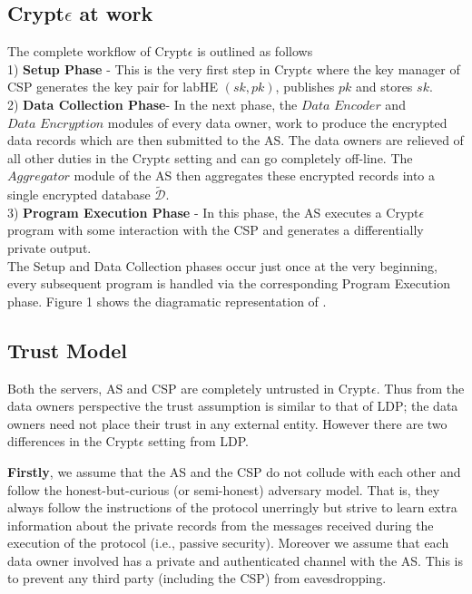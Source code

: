 \subsection{Crypt$\epsilon$ at work}
The complete workflow of Crypt$\epsilon$ is outlined as follows\\1) \textbf{\textsf{Setup Phase}} - This is the very first step in Crypt$\epsilon$ where the key manager of \textsf{CSP} generates the key pair for labHE $(sk,pk)$, publishes $pk$ and stores $sk$. \\2) \textbf{\textsf{Data Collection Phase}}- In the next phase, the $\textit{Data 
Encoder}$ and $\textit{Data Encryption}$ modules of every data owner, work to produce the encrypted data records which are then submitted to the \textsf{AS}. The data owners are relieved of all other duties in the Crypt$\epsilon$ setting and can go completely off-line. The $\textit{Aggregator}$ module of the \textsf{AS} then aggregates these encrypted records into a single encrypted database $\boldsymbol{\tilde{\mathcal{D}}}$. \\3) \textbf{\textsf{ Program Execution Phase}} - In this phase, the \textsf{AS} executes a Crypt$\epsilon$ program with some interaction with the \textsf{CSP}  and generates a differentially private output.  \\
The \textsf{Setup} and \textsf{Data Collection} phases occur just once at the very beginning, every subsequent program  is handled via the corresponding  \textsf{Program Execution} phase. Figure 1 shows the diagramatic representation of \system.
\subsection{Trust Model}
Both the servers, \textsf{AS} and \textsf{CSP} are completely untrusted in Crypt$\epsilon$. 
Thus from the data owners perspective the trust assumption is similar to that of \textsf{LDP}; the data owners need not place their trust in any external entity. 
However there are two differences in the Crypt$\epsilon$ setting from \textsf{LDP}.

 \textbf{Firstly}, we assume that the \textsf{AS} and the \textsf{CSP} do not collude with each other and follow the honest-but-curious (or semi-honest) adversary model. That is, they always follow the instructions of the protocol unerringly but strive to learn extra information about the private records from the messages received during the execution of the protocol (i.e., passive security). Moreover we assume that each data owner involved has a private and authenticated channel with the \textsf{AS}. This is to prevent any third party (including the \textsf{CSP}) from eavesdropping. 
 
